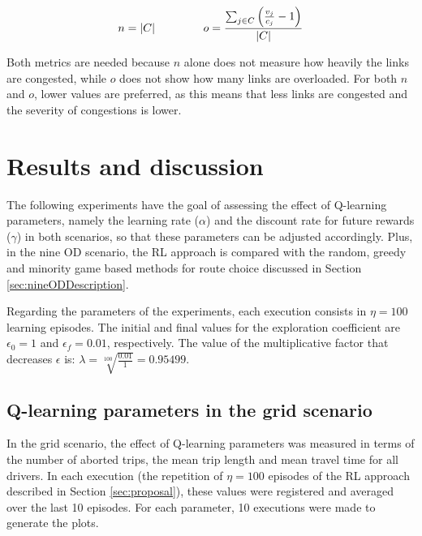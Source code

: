 \documentclass{RITA}
\newcommand{\linkCap}{\ensuremath{c_j}}		%
\newcommand{\veh}{\ensuremath{v}}		%
\newcommand{\congRoads}{\ensuremath{C}}		%
\newcommand{\numCong}{\ensuremath{n}}		%
\newcommand{\overLoadFactor}{\ensuremath{o}}	%
\newcommand{\numepis}{\ensuremath{\eta}}	%
\begin{document}
\begin{equation}
\label{eq:balanceMetrics}
\numCong = |\congRoads| \hspace{1.5cm}  \overLoadFactor = \frac{ \sum_{\substack{j \in \congRoads}} \left(\frac{\veh_j}{\linkCap} -1 \right)}{|C|}
\end{equation}

Both metrics are needed because $n$ alone does not measure how heavily the links are congested, while $o$ does not show how many links are overloaded. For both $n$ and $o$, lower values are preferred, as this means that less links are congested and the severity of congestions is lower.

\section{Results and discussion}
\label{sec:results}

The following experiments have the goal of assessing the effect of Q-learning parameters, namely the learning rate ($\alpha$) and the discount rate for future rewards ($\gamma$) in both scenarios, so that these parameters can be adjusted accordingly. Plus, in the nine OD scenario, the RL approach is compared with the random, greedy and minority game based methods for route choice discussed in Section \ref{sec:nineODDescription}.

Regarding the parameters of the experiments, each execution consists in $\numepis = 100$ learning episodes. The initial and final values for the exploration coefficient are $\epsilon_0 = 1$ and $\epsilon_f = 0.01$, respectively. The value of the multiplicative factor that decreases $\epsilon$ is: $\lambda = \sqrt[100]{\frac{0.01}{1}} = 0.95499$.


\subsection{Q-learning parameters in the grid scenario}


In the grid scenario, the effect of Q-learning parameters was measured in terms of the number of aborted trips, the mean trip length and mean travel time for all drivers. In each execution (the repetition of $\numepis = 100$ episodes of the RL approach described in Section \ref{sec:proposal}), these values were registered and averaged over the last 10 episodes. For each parameter, 10 executions were made to generate the plots.
\end{document}
